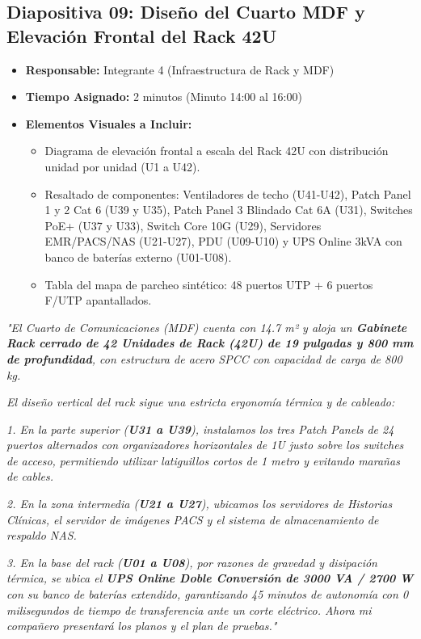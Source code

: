 \documentclass[11pt,a4paper]{article}
\begin{document}
\newpage

\subsection{Diapositiva 09: Diseño del Cuarto MDF y Elevación Frontal del Rack 42U}
\begin{itemize}[leftmargin=*]
    \item \textbf{Responsable:} Integrante 4 (Infraestructura de Rack y MDF)
    \item \textbf{Tiempo Asignado:} 2 minutos (Minuto 14:00 al 16:00)
    \item \textbf{Elementos Visuales a Incluir:}
    \begin{itemize}
        \item Diagrama de elevación frontal a escala del Rack 42U con distribución unidad por unidad (U1 a U42).
        \item Resaltado de componentes: Ventiladores de techo (U41-U42), Patch Panel 1 y 2 Cat 6 (U39 y U35), Patch Panel 3 Blindado Cat 6A (U31), Switches PoE+ (U37 y U33), Switch Core 10G (U29), Servidores EMR/PACS/NAS (U21-U27), PDU (U09-U10) y UPS Online 3kVA con banco de baterías externo (U01-U08).
        \item Tabla del mapa de parcheo sintético: 48 puertos UTP + 6 puertos F/UTP apantallados.
    \end{itemize}
\end{itemize}

\begin{tcolorbox}[colback=white,colframe=primaryblue,title=\textbf{Speech Verbal del Integrante 4 (Guion Palabra por Palabra)}]
\textit{"El Cuarto de Comunicaciones (MDF) cuenta con 14.7 m² y aloja un \textbf{Gabinete Rack cerrado de 42 Unidades de Rack (42U) de 19 pulgadas y 800 mm de profundidad}, con estructura de acero SPCC con capacidad de carga de 800 kg.}\par\vspace{2mm}
\textit{El diseño vertical del rack sigue una estricta ergonomía térmica y de cableado:}\par
\textit{1. En la parte superior (\textbf{U31 a U39}), instalamos los tres Patch Panels de 24 puertos alternados con organizadores horizontales de 1U justo sobre los switches de acceso, permitiendo utilizar latiguillos cortos de 1 metro y evitando marañas de cables.}\par
\textit{2. En la zona intermedia (\textbf{U21 a U27}), ubicamos los servidores de Historias Clínicas, el servidor de imágenes PACS y el sistema de almacenamiento de respaldo NAS.}\par
\textit{3. En la base del rack (\textbf{U01 a U08}), por razones de gravedad y disipación térmica, se ubica el \textbf{UPS Online Doble Conversión de 3000 VA / 2700 W} con su banco de baterías extendido, garantizando 45 minutos de autonomía con 0 milisegundos de tiempo de transferencia ante un corte eléctrico. Ahora mi compañero presentará los planos y el plan de pruebas."}
\end{tcolorbox}
\end{document}
